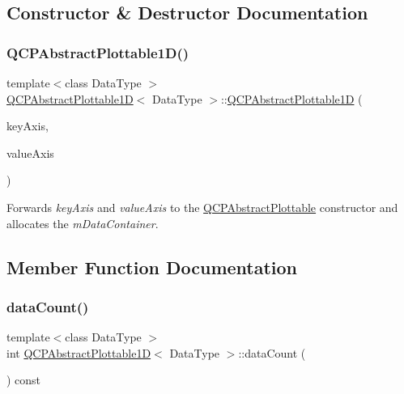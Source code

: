 \subsection{Constructor \& Destructor Documentation}
\mbox{\label{classQCPAbstractPlottable1D_a30b2e50ab0afce65f104ea7a95440315}} 
\subsubsection{\texorpdfstring{Q\+C\+P\+Abstract\+Plottable1\+D()}{QCPAbstractPlottable1D()}}
{\footnotesize\ttfamily template$<$class Data\+Type $>$ \\
\hyperlink{classQCPAbstractPlottable1D}{Q\+C\+P\+Abstract\+Plottable1D}$<$ Data\+Type $>$\+::\hyperlink{classQCPAbstractPlottable1D}{Q\+C\+P\+Abstract\+Plottable1D} (\begin{DoxyParamCaption}\item[{\hyperlink{classQCPAxis}{Q\+C\+P\+Axis} $\ast$}]{key\+Axis,  }\item[{\hyperlink{classQCPAxis}{Q\+C\+P\+Axis} $\ast$}]{value\+Axis }\end{DoxyParamCaption})}

Forwards {\itshape key\+Axis} and {\itshape value\+Axis} to the \hyperlink{classQCPAbstractPlottable_af78a036e40db6f53a31abadc5323715a}{Q\+C\+P\+Abstract\+Plottable} constructor and allocates the {\itshape m\+Data\+Container}. 

\subsection{Member Function Documentation}
\mbox{\label{classQCPAbstractPlottable1D_ab5dd99e4f1621e7dbd63438e0b02984e}} 
\subsubsection{\texorpdfstring{data\+Count()}{dataCount()}}
{\footnotesize\ttfamily template$<$class Data\+Type $>$ \\
int \hyperlink{classQCPAbstractPlottable1D}{Q\+C\+P\+Abstract\+Plottable1D}$<$ Data\+Type $>$\+::data\+Count (\begin{DoxyParamCaption}{ }\end{DoxyParamCaption}) const\hspace{0.3cm}{\ttfamily [virtual]}}






